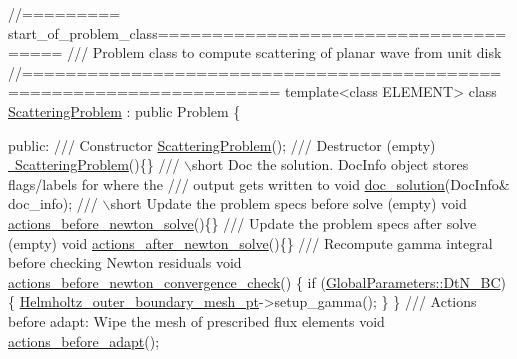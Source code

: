  
\begin{DoxyCodeInclude}
\textcolor{comment}{//========= start\_of\_problem\_class=====================================}
\textcolor{comment}{/// Problem class to compute scattering of planar wave from unit disk}
\textcolor{comment}{}\textcolor{comment}{//=====================================================================}
\textcolor{keyword}{template}<\textcolor{keyword}{class} ELEMENT> 
\textcolor{keyword}{class }\hyperlink{classScatteringProblem}{ScatteringProblem} : \textcolor{keyword}{public} Problem
\{

\textcolor{keyword}{public}:
 \textcolor{comment}{}
\textcolor{comment}{ /// Constructor}
\textcolor{comment}{} \hyperlink{classScatteringProblem_a94710f5d2ee52abc3df9dc8d1fd3eb71}{ScatteringProblem}();
 \textcolor{comment}{}
\textcolor{comment}{ /// Destructor (empty)}
\textcolor{comment}{} \hyperlink{classScatteringProblem_a0a9838027d0286f22706fe6945bbac0a}{~ScatteringProblem}()\{\}
\textcolor{comment}{}
\textcolor{comment}{ /// \(\backslash\)short Doc the solution. DocInfo object stores flags/labels for where the}
\textcolor{comment}{ /// output gets written to}
\textcolor{comment}{} \textcolor{keywordtype}{void} \hyperlink{classScatteringProblem_af83ab14c4f4750ea17c21466f6c6364f}{doc\_solution}(DocInfo& doc\_info);
 \textcolor{comment}{}
\textcolor{comment}{ /// \(\backslash\)short Update the problem specs before solve (empty)}
\textcolor{comment}{} \textcolor{keywordtype}{void} \hyperlink{classScatteringProblem_a91ce14b928ec6edbb9d85515a310b1fb}{actions\_before\_newton\_solve}()\{\} 
\textcolor{comment}{}
\textcolor{comment}{ /// Update the problem specs after solve (empty)}
\textcolor{comment}{} \textcolor{keywordtype}{void} \hyperlink{classScatteringProblem_abf1e7b97518c94e12802205dec08b15e}{actions\_after\_newton\_solve}()\{\}
 \textcolor{comment}{}
\textcolor{comment}{ /// Recompute gamma integral before checking Newton residuals}
\textcolor{comment}{} \textcolor{keywordtype}{void} \hyperlink{classScatteringProblem_ad096c311ee474d23514656d2ba76a4b8}{actions\_before\_newton\_convergence\_check}()
  \{
   \textcolor{keywordflow}{if} (\hyperlink{namespaceGlobalParameters_a6e2bba1769e86a5d3db88e2c7062bc63}{GlobalParameters::DtN\_BC})
    \{
     \hyperlink{classScatteringProblem_a9692c8592b57a4363e557e5b012c744b}{Helmholtz\_outer\_boundary\_mesh\_pt}->setup\_gamma();
    \}
  \}
\textcolor{comment}{}
\textcolor{comment}{ /// Actions before adapt: Wipe the mesh of prescribed flux elements}
\textcolor{comment}{} \textcolor{keywordtype}{void} \hyperlink{classScatteringProblem_aca1b756a307f9c1d8a70c7b7e68a296b}{actions\_before\_adapt}();

\end{DoxyCodeInclude}
